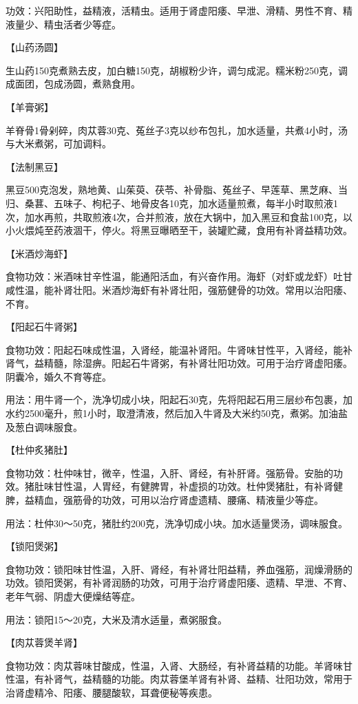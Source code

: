 \documentclass[12pt,UTF8]{ctexbook}
\begin{document}
功效：兴阳助性，益精液，活精虫。适用于肾虚阳痿、早泄、滑精、男性不育、精液量少、精虫活者少等症。

【山药汤圆】

生山药150克煮熟去皮，加白糖150克，胡椒粉少许，调匀成泥。糯米粉250克，调成面团，包成汤圆，煮熟食用。

【羊膏粥】

羊脊骨1骨剁碎，肉苁蓉30克、菟丝子3克以纱布包扎，加水适量，共煮4小时，汤与大米煮粥，可加调料。

【法制黑豆】

黑豆500克泡发，熟地黄、山茱萸、茯苓、补骨脂、菟丝子、早莲草、黑芝麻、当归、桑葚、五味子、枸杞子、地骨皮各10克，加水适量煎煮，每半小时取煎液1次，加水再煎，共取煎液4次，合并煎液，放在大锅中，加入黑豆和食盐100克，以小火煨炖至药液涸干，停火。将黑豆曝晒至干，装罐贮藏，食用有补肾益精功效。

【米酒炒海虾】

食物功效：米酒味甘辛性温，能通阳活血，有兴奋作用。海虾（对虾或龙虾）吐甘咸性温，能补肾壮阳。米酒炒海虾有补肾壮阳，强筋健骨的功效。常用以治阳痿、不育。

【阳起石牛肾粥】

食物功效：阳起石味成性温，入肾经，能温补肾阳。牛肾味甘性平，入肾经，能补肾气，益精髓，除湿痹。阳起石牛肾粥，有补肾壮阳功效。可用于治疗肾虚阳痿。阴囊冷，婚久不育等症。

用法：用牛肾一个，洗净切成小块，阳起石30克，先将阳起石用三层纱布包裹，加水约2500毫升，煎1小时，取澄清液，然后加入牛肾及大米约50克，煮粥。加油盐及葱白调味服食。

【杜仲炙猪肚】

食物功效：杜仲味甘，微辛，性温，入肝、肾经，有补肝肾。强筋骨。安胎的功效。猪肚味甘性温，人胃经，有健脾胃，补虚损的功效。杜仲煲猪肚，有补肾健脾，益精血，强筋骨的功效，可用以治疗肾虚遗精、腰痛、精液量少等症。

用法：杜仲30～50克，猪肚约200克，洗净切成小块。加水适量煲汤，调味服食。

【锁阳煲粥】

食物功效：锁阳味甘性温，入肝、肾经，有补肾壮阳益精，养血强筋，润燥滑肠的功效。锁阳煲粥，有补肾润肠的功效，可用于治疗肾虚阳痿、遗精、早泄、不育、老年气弱、阴虚大便燥结等症。

用法：锁阳15～20克，大米及清水适量，煮粥服食。

【肉苁蓉煲羊肾】

食物功效：肉苁蓉味甘酸成，性温，入肾、大肠经，有补肾益精的功能。羊肾味甘性温，有补肾气，益精髓的功能。肉苁蓉堡羊肾有补肾、益精、壮阳功效，常用于治肾虚精冷、阳痿、腰腿酸软，耳聋便秘等疾患。
\end{document}
